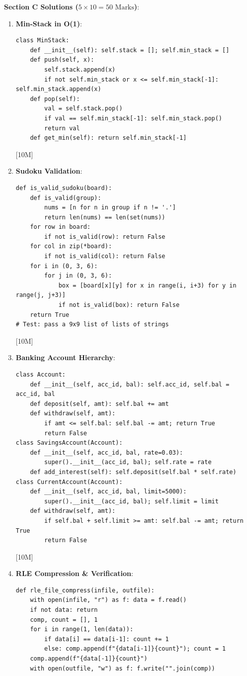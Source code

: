 \begin{solutionbox}
\medskip
\noindent\textbf{Section C Solutions ($5 \times 10 = 50\text{ Marks}$)}:
\begin{enumerate}[start=17]
    \item \textbf{Min-Stack in O(1)}:
    \begin{lstlisting}[language=Python3]
class MinStack:
    def __init__(self): self.stack = []; self.min_stack = []
    def push(self, x):
        self.stack.append(x)
        if not self.min_stack or x <= self.min_stack[-1]: self.min_stack.append(x)
    def pop(self):
        val = self.stack.pop()
        if val == self.min_stack[-1]: self.min_stack.pop()
        return val
    def get_min(self): return self.min_stack[-1]
    \end{lstlisting} [10M]
    \item \textbf{Sudoku Validation}:
    \begin{lstlisting}[language=Python3]
def is_valid_sudoku(board):
    def is_valid(group):
        nums = [n for n in group if n != '.']
        return len(nums) == len(set(nums))
    for row in board:
        if not is_valid(row): return False
    for col in zip(*board):
        if not is_valid(col): return False
    for i in (0, 3, 6):
        for j in (0, 3, 6):
            box = [board[x][y] for x in range(i, i+3) for y in range(j, j+3)]
            if not is_valid(box): return False
    return True
# Test: pass a 9x9 list of lists of strings
    \end{lstlisting} [10M]
    \item \textbf{Banking Account Hierarchy}:
    \begin{lstlisting}[language=Python3]
class Account:
    def __init__(self, acc_id, bal): self.acc_id, self.bal = acc_id, bal
    def deposit(self, amt): self.bal += amt
    def withdraw(self, amt):
        if amt <= self.bal: self.bal -= amt; return True
        return False
class SavingsAccount(Account):
    def __init__(self, acc_id, bal, rate=0.03):
        super().__init__(acc_id, bal); self.rate = rate
    def add_interest(self): self.deposit(self.bal * self.rate)
class CurrentAccount(Account):
    def __init__(self, acc_id, bal, limit=5000):
        super().__init__(acc_id, bal); self.limit = limit
    def withdraw(self, amt):
        if self.bal + self.limit >= amt: self.bal -= amt; return True
        return False
    \end{lstlisting} [10M]
    \item \textbf{RLE Compression \& Verification}:
    \begin{lstlisting}[language=Python3]
def rle_file_compress(infile, outfile):
    with open(infile, "r") as f: data = f.read()
    if not data: return
    comp, count = [], 1
    for i in range(1, len(data)):
        if data[i] == data[i-1]: count += 1
        else: comp.append(f"{data[i-1]}{count}"); count = 1
    comp.append(f"{data[-1]}{count}")
    with open(outfile, "w") as f: f.write("".join(comp))


\end{lstlisting}
\end{enumerate}
\end{solutionbox}
